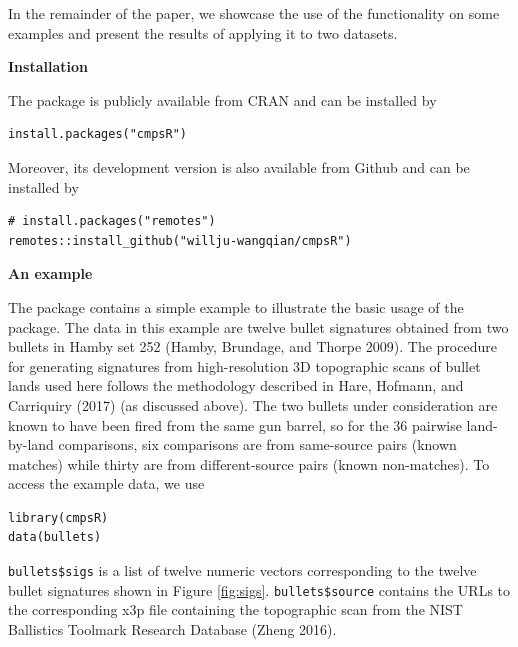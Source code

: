 In the remainder of the paper, we showcase the use of the  functionality on some examples and present the results of applying it to two datasets.

\textbf{Installation}

The  package is publicly available from CRAN and can be installed by

\begin{verbatim}
install.packages("cmpsR")
\end{verbatim}

Moreover, its development version is also available from Github and can be installed by

\begin{verbatim}
# install.packages("remotes")
remotes::install_github("willju-wangqian/cmpsR")
\end{verbatim}

\textbf{An example}

The  package contains a simple example to illustrate the basic usage of the package.
The data in this example are twelve bullet signatures obtained from two bullets in Hamby set 252 (Hamby, Brundage, and Thorpe 2009).
The procedure for generating signatures from high-resolution 3D topographic scans of bullet lands used here follows the methodology described in Hare, Hofmann, and Carriquiry (2017) (as discussed above).
The two bullets under consideration are known to have been fired from the same gun barrel, so for the 36 pairwise land-by-land comparisons, six comparisons are from same-source pairs (known matches) while thirty are from different-source pairs (known non-matches).
To access the example data, we use

\begin{verbatim}
library(cmpsR)
data(bullets)
\end{verbatim}

\texttt{bullets\$sigs} is a list of twelve numeric vectors corresponding to the twelve bullet signatures shown in Figure \ref{fig:sigs}.
\texttt{bullets\$source} contains the URLs to the corresponding x3p file containing the topographic scan from the NIST Ballistics Toolmark Research Database (Zheng 2016).

